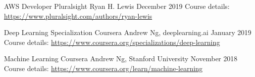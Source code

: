 
\begin{cventries}
  \cventry
    {AWS Developer}
    {Pluralsight}
    {Ryan H. Lewis}
    {December 2019}
    {Course details: \url{https://www.pluralsight.com/authors/ryan-lewis}}

  \cventry
    {Deep Learning Specialization}
    {Coursera}
    {Andrew Ng, deeplearning.ai}
    {January 2019}
    {Course details: \url{https://www.coursera.org/specializations/deep-learning}}

  \cventry
    {Machine Learning}
    {Coursera}
    {Andrew Ng, Stanford University}
    {November 2018}
    {Course details: \url{https://www.coursera.org/learn/machine-learning}}

\end{cventries}
